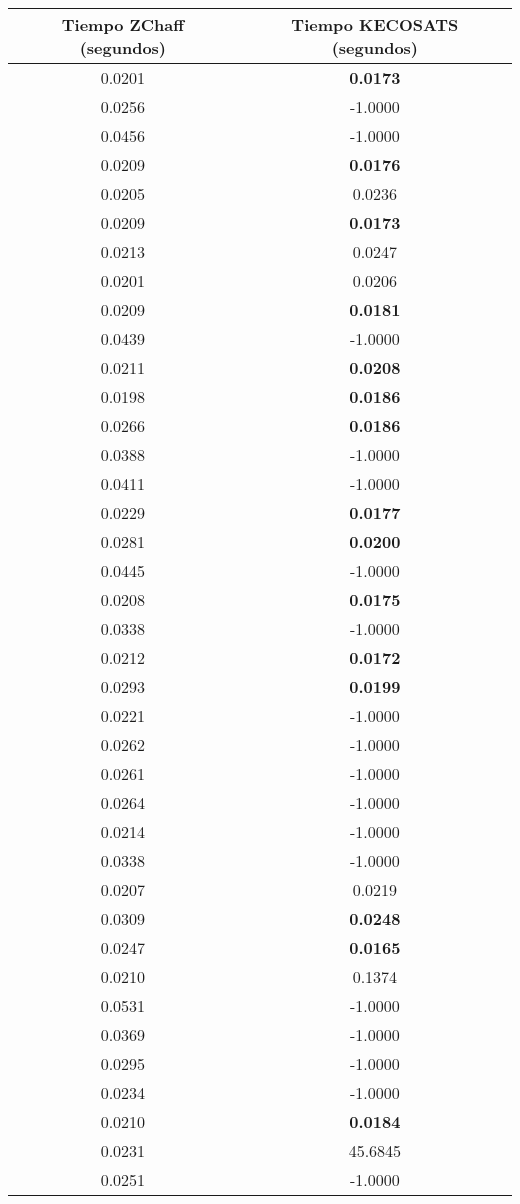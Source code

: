 \begin{longtable}{c|c}
\textbf{Tiempo ZChaff} (segundos) & \textbf{Tiempo KECOSATS} (segundos) \\\hline
0.0201 & \textbf{0.0173} \\
0.0256 & -1.0000 \\
0.0456 & -1.0000 \\
0.0209 & \textbf{0.0176} \\
0.0205 & 0.0236 \\
0.0209 & \textbf{0.0173} \\
0.0213 & 0.0247 \\
0.0201 & 0.0206 \\
0.0209 & \textbf{0.0181} \\
0.0439 & -1.0000 \\\hline
0.0211 & \textbf{0.0208} \\
0.0198 & \textbf{0.0186} \\
0.0266 & \textbf{0.0186} \\
0.0388 & -1.0000 \\
0.0411 & -1.0000 \\
0.0229 & \textbf{0.0177} \\
0.0281 & \textbf{0.0200} \\
0.0445 & -1.0000 \\
0.0208 & \textbf{0.0175} \\
0.0338 & -1.0000 \\\hline
0.0212 & \textbf{0.0172} \\
0.0293 & \textbf{0.0199} \\
0.0221 & -1.0000 \\
0.0262 & -1.0000 \\
0.0261 & -1.0000 \\
0.0264 & -1.0000 \\
0.0214 & -1.0000 \\
0.0338 & -1.0000 \\
0.0207 & 0.0219 \\
0.0309 & \textbf{0.0248} \\\hline
0.0247 & \textbf{0.0165} \\
0.0210 & 0.1374 \\
0.0531 & -1.0000 \\
0.0369 & -1.0000 \\
0.0295 & -1.0000 \\
0.0234 & -1.0000 \\
0.0210 & \textbf{0.0184} \\
0.0231 & 45.6845 \\
0.0251 & -1.0000 \\

\end{longtable}
